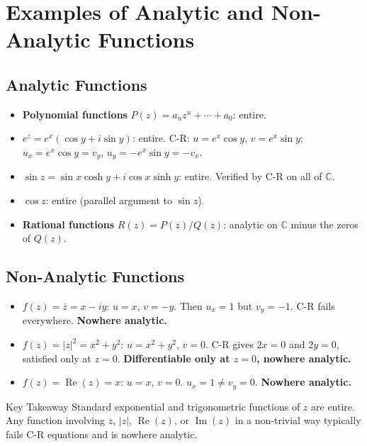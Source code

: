 \documentclass[12pt,a4paper]{article}
\begin{document}
\section{Examples of Analytic and Non-Analytic Functions}

\subsection*{Analytic Functions}

\begin{itemize}
  \item \textbf{Polynomial functions} $P(z) = a_n z^n + \cdots + a_0$: entire.
  \item $e^{z} = e^{x}(\cos y + i\sin y)$: entire.  C-R: $u=e^x\cos y$, $v=e^x\sin y$; $u_x = e^x\cos y = v_y$, $u_y = -e^x\sin y = -v_x$. \checkmark
  \item $\sin z = \sin x\cosh y + i\cos x\sinh y$: entire. Verified by C-R on all of $\mathbb{C}$.
  \item $\cos z$: entire (parallel argument to $\sin z$).
  \item \textbf{Rational functions} $R(z) = P(z)/Q(z)$: analytic on $\mathbb{C}$ minus the zeros of $Q(z)$.
\end{itemize}

\subsection*{Non-Analytic Functions}

\begin{itemize}
  \item $f(z) = \overline{z} = x - iy$: $u=x$, $v=-y$. Then $u_x = 1$ but $v_y = -1$. C-R fails everywhere. \textbf{Nowhere analytic.}
  \item $f(z) = |z|^{2} = x^{2}+y^{2}$: $u = x^2+y^2$, $v=0$. C-R gives $2x=0$ and $2y=0$, satisfied only at $z=0$. \textbf{Differentiable only at $z=0$, nowhere analytic.}
  \item $f(z) = \operatorname{Re}(z) = x$: $u=x$, $v=0$. $u_x=1 \neq v_y=0$. \textbf{Nowhere analytic.}
\end{itemize}

\begin{learnbox}{Key Takeaway}
Standard exponential and trigonometric functions of $z$ are entire. Any function involving $\overline{z}$, $|z|$, $\operatorname{Re}(z)$, or $\operatorname{Im}(z)$ in a non-trivial way typically fails C-R equations and is nowhere analytic.
\end{learnbox}
\end{document}

